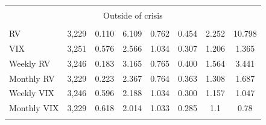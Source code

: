 \begin{table}[!htbp]
\begin{tabular}{@{\extracolsep{5pt}}lccccccc}
\hline \\[-1.8ex] 
\multicolumn{8}{c}{Outside of crisis} \\
\hline \\[-1.8ex] 
RV & 3,229 & 0.110 & 6.109 & 0.762 & 0.454 & 2.252 & 10.798\\ 
VIX & 3,251 & 0.576 & 2.566 & 1.034 & 0.307 & 1.206 & 1.365 \\ 
Weekly RV & 3,246 & 0.183 & 3.165 & 0.765 & 0.400 & 1.564 &  3.441\\ 
Monthly RV & 3,229 & 0.223 & 2.367 & 0.764 & 0.363 & 1.308 & 1.687  \\ 
Weekly VIX & 3,246 & 0.596 & 2.188 & 1.034 & 0.300  & 1.157 &  1.047 \\ 
Monthly VIX & 3,229 & 0.618 & 2.014 & 1.033 & 0.285 &  1.1 & 0.78\\ 
\hline \\[-1.8ex] 
\end{tabular} 
\end{table} 


